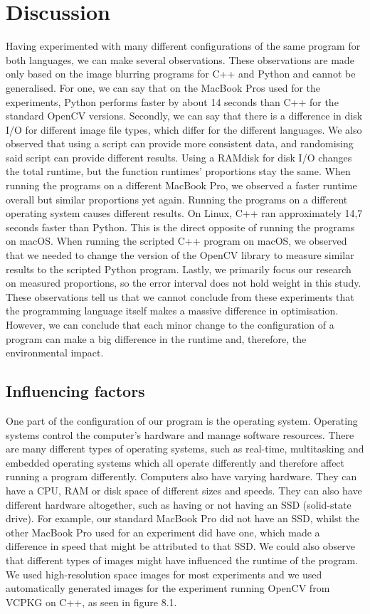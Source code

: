 \chapter{Discussion}
Having experimented with many different configurations of the same program for both languages, we can make several observations. These observations are made only based on the image blurring programs for C++ and Python and cannot be generalised.
For one, we can say that on the MacBook Pros used for the experiments, Python performs faster by about 14 seconds than C++ for the standard OpenCV versions. Secondly, we can say that there is a difference in disk I/O for different image file types, which differ for the different languages. We also observed that using a script can provide more consistent data, and randomising said script can provide different results. Using a RAMdisk for disk I/O changes the total runtime, but the function runtimes' proportions stay the same. When running the programs on a different MacBook Pro, we observed a faster runtime overall but similar proportions yet again. Running the programs on a different operating system causes different results. On Linux, C++ ran approximately 14,7 seconds faster than Python. This is the direct opposite of running the programs on macOS. When running the scripted C++ program on macOS, we observed that we needed to change the version of the OpenCV library to measure similar results to the scripted Python program. Lastly, we primarily focus our research on measured proportions, so the error interval does not hold weight in this study.
These observations tell us that we cannot conclude from these experiments that the programming language itself makes a massive difference in optimisation. However, we can conclude that each minor change to the configuration of a program can make a big difference in the runtime and, therefore, the environmental impact.

\section{Influencing factors}
One part of the configuration of our program is the operating system. Operating systems control the computer’s hardware and manage software resources. There are many different types of operating systems, such as real-time, multitasking and embedded operating systems which all operate differently and therefore affect running a program differently.
Computers also have varying hardware. They can have a CPU, RAM or disk space of different sizes and speeds. They can also have different hardware altogether, such as having or not having an SSD (solid-state drive). For example, our standard MacBook Pro did not have an SSD, whilst the other MacBook Pro used for an experiment did have one, which made a difference in speed that might be attributed to that SSD.
We could also observe that different types of images might have influenced the runtime of the program. We used high-resolution space images for most experiments and we used automatically generated images for the experiment running OpenCV from VCPKG on C++, as seen in figure 8.1.

